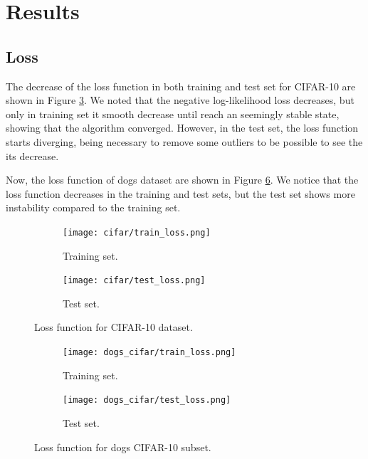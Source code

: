 \documentclass{article}
\begin{document}
\section{Results}

\subsection{Loss}

The decrease of the loss function in both training and test set for CIFAR-10 are shown in Figure \ref{fig:cifarLoss}. We noted that the negative log-likelihood loss decreases, but only in training set it smooth decrease until reach an seemingly stable state, showing that the algorithm converged. However, in the test set, the loss function starts diverging, being necessary to remove some outliers to be possible to see the its decrease. 

Now, the loss function of dogs dataset are shown in Figure \ref{fig:dogsLoss}. We notice that the loss function decreases in the training and test sets, but the test set shows more instability compared to the training set.

\begin{figure}
  \begin{subfigure}[t]{0.49\textwidth}
    \centering
    \texttt{[image: cifar/train\_loss.png]}
    \caption{Training set.}
    \label{fig:cifarTrainLoss}
  \end{subfigure}
  \hfill
  \begin{subfigure}[t]{0.49\textwidth}
    \centering
    \texttt{[image: cifar/test\_loss.png]}
    \caption{Test set.}
    \label{fig:cifarTestLoss}
  \end{subfigure}
  \caption{Loss function for CIFAR-10 dataset.}
  \label{fig:cifarLoss}
\end{figure}

\begin{figure}
  \begin{subfigure}[t]{0.49\textwidth}
    \centering
    \texttt{[image: dogs\_cifar/train\_loss.png]}
    \caption{Training set.}
    \label{fig:dogsTrainLoss}
  \end{subfigure}
  \hfill
  \begin{subfigure}[t]{0.49\textwidth}
    \centering
    \texttt{[image: dogs\_cifar/test\_loss.png]}
    \caption{Test set.}
    \label{fig:dogsTestLoss}
  \end{subfigure}
  \caption{Loss function for dogs CIFAR-10 subset.}
  \label{fig:dogsLoss}
\end{figure}
\end{document}
